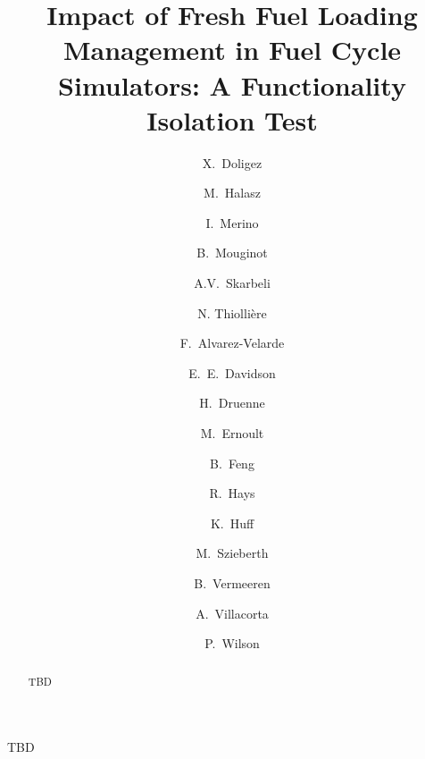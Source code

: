 \documentclass[review]{elsarticle}
\begin{document}
\begin{frontmatter}

\title{Impact of Fresh Fuel Loading Management in Fuel Cycle Simulators: A Functionality Isolation Test}



\author[IPNO]{X.~Doligez}
\author[BUD]{M.~Halasz}
\author[MAULE]{I.~Merino}
\author[MAD]{B.~Mouginot}
\author[CIEMAT]{A.V.~Skarbeli}

\author[SUB]{N. Thiolli\`ere }

\author[CIEMAT]{F.~Alvarez-Velarde}
\author[ORNL]{E.~E.~Davidson}
\author[TRACT]{H.~Druenne}
\author[IPNO]{M.~Ernoult}
\author[ANL]{B.~Feng}
\author[INL]{R.~Hays}
\author[UI]{K.~Huff}
\author[BUD]{M.~Szieberth}
\author[TRACT]{B.~Vermeeren}
\author[CIEMAT]{A.~Villacorta}
\author[MAD]{P.~Wilson}


\address[IPNO]{Institut de Physique Nucléaire d’Orsay, CNRS-IN2P3/Univ, Paris-Sud, France}
\address[BUD]{Budapest University of Technology and Economics (BME), Institute of Nuclear Techniques, 1111 Budapest, Müegyetem rkp. 3-9, Hungary}
\address[MAULE]{Catholic University of the Maule, Av. San Miguel 3605, Talca, Chile}
\address[MAD]{Univ. of Wisconsin Madison, Department of Nuclear Engineering and Engineering Physics, Madison, WI, United States}
\address[CIEMAT]{CIEMAT, Avda. Complutense, 40, 28040 Madrid, Spain}
\address[SUB]{Subatech, IMTA-IN2P3/CNRS-Universit\'e, Nantes, F-44307, France}

\address[ORNL]{Oak Ridge National Laboratory, Building 5700, Mail Stop 6172, Oak Ridge, TN 37831, United States}
\address[TRACT]{Tractebel Engie, Boulevard Simón Bolívar 34-36, 1000 Brussels, Belgium}
\address[ANL]{Argonne National Laboratory, 9700 Cass Ave., Lemont, IL 60439, USA}
\address[INL]{Idaho National Laboratory, 2525 Fremont Ave., Idaho Falls, ID 83402, USA}
\address[UI]{University of Illinois, Department of Nuclear, Plasma, and Radiological Engineering, United States}


\begin{abstract}

TBD

\end{abstract}

\begin{keyword}

TBD 

\end{keyword}

\end{frontmatter}
\end{document}
